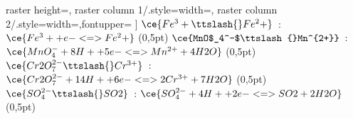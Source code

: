 \begin{tcbitemize}
\begin{tcbitemize}
               raster height=\tcbtextheight,
               raster column 1/.style={width=\cwii},
               raster column 2/.style={width=\cwiii,fontupper=\bfseries}
            ]
            \tcbitem $\ce{Fe^3+\ttslash{}Fe^2+}$~: \qquad
                     $\ce{Fe^3+ + e- <=> Fe^2+}$
            \tcbitem (0,5pt)
            \tcbitem $\ce{MnO$_4^-$\ttslash{}Mn^{2+}}$~: \qquad
                     $\ce{MnO_4^- + 8H+ + 5e- <=> Mn^{2+} + 4H2O}$
            \tcbitem (0,5pt)
            \tcbitem $\ce{Cr2O^{2-}_7\ttslash{}Cr^{3+}}$~: \qquad
                     $\ce{Cr2O^{2-}_7 + 14H+ + 6e- <=> 2Cr^{3+} + 7H2O}$
            \tcbitem (0,5pt)
            \tcbitem $\ce{SO^{2-}_4\ttslash{}SO2}$~: \qquad
                     $\ce{SO^{2-}_4 + 4H+ + 2e- <=> SO2 + 2H2O}$
            \tcbitem (0,5pt)
        \end{tcbitemize}
\end{tcbitemize}





